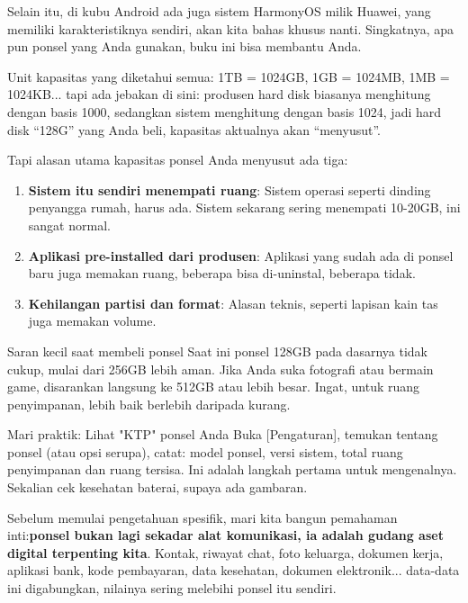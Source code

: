 Selain itu, di kubu Android ada juga sistem HarmonyOS milik Huawei, yang memiliki karakteristiknya sendiri, akan kita bahas khusus nanti. Singkatnya, apa pun ponsel yang Anda gunakan, buku ini bisa membantu Anda.


Unit kapasitas yang diketahui semua: 1TB = 1024GB, 1GB = 1024MB, 1MB = 1024KB... tapi ada jebakan di sini: produsen hard disk biasanya menghitung dengan basis 1000, sedangkan sistem menghitung dengan basis 1024, jadi hard disk “128G” yang Anda beli, kapasitas aktualnya akan “menyusut”.

Tapi alasan utama kapasitas ponsel Anda menyusut ada tiga:

\begin{enumerate}
  \item \textbf{Sistem itu sendiri menempati ruang}: Sistem operasi seperti dinding penyangga rumah, harus ada. Sistem sekarang sering menempati 10-20GB, ini sangat normal.
  \item \textbf{Aplikasi pre-installed dari produsen}: Aplikasi yang sudah ada di ponsel baru juga memakan ruang, beberapa bisa di-uninstal, beberapa tidak.
  \item \textbf{Kehilangan partisi dan format}: Alasan teknis, seperti lapisan kain tas juga memakan volume.
\end{enumerate}

\begin{tcbinfo}{Saran kecil saat membeli ponsel}
Saat ini ponsel 128GB pada dasarnya tidak cukup, mulai dari 256GB lebih aman. Jika Anda suka fotografi atau bermain game, disarankan langsung ke 512GB atau lebih besar. Ingat, untuk ruang penyimpanan, lebih baik berlebih daripada kurang.

\end{tcbinfo}

\begin{tcbpractice}{Mari praktik: Lihat "KTP" ponsel Anda}
Buka [Pengaturan], temukan tentang ponsel (atau opsi serupa), catat: model ponsel, versi sistem, total ruang penyimpanan dan ruang tersisa. Ini adalah langkah pertama untuk mengenalnya. Sekalian cek kesehatan baterai, supaya ada gambaran.

\end{tcbpractice}


Sebelum memulai pengetahuan spesifik, mari kita bangun pemahaman inti:\textbf{ponsel bukan lagi sekadar alat komunikasi, ia adalah gudang aset digital terpenting kita}. Kontak, riwayat chat, foto keluarga, dokumen kerja, aplikasi bank, kode pembayaran, data kesehatan, dokumen elektronik... data-data ini digabungkan, nilainya sering melebihi ponsel itu sendiri.

